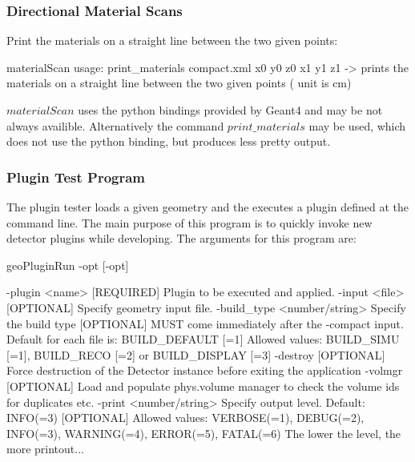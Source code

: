 \documentclass[10pt,a4paper]{article}
\begin{document}
\subsubsection{Directional Material Scans}
\label{sec:dd4hep-manual-directional-material-scans}
\noindent
Print the materials on a straight line between the two given points:
\begin{code}
materialScan
 usage: print_materials compact.xml x0 y0 z0 x1 y1 z1 
        -> prints the materials on a straight line between the two given points ( unit is cm) 
\end{code}
$materialScan$ uses the python bindings provided by Geant4 and may be not 
always availible. Alternatively the command $print\_materials$ may be used, 
which does not use the python binding, but produces less pretty output.

\subsubsection{Plugin Test Program}
\label{sec:dd4hep-manual-plugin-test}
\noindent
The plugin tester loads a given geometry and the executes a plugin
defined at the command line. The main purpose of this program is to quickly 
invoke new detector plugins while developing. The arguments for this 
program are:
\begin{code}
    geoPluginRun -opt [-opt]                                                
    
        -plugin <name>  [REQUIRED]  Plugin to be executed and applied.        
        -input  <file>  [OPTIONAL]  Specify geometry input file.              
        -build_type <number/string> Specify the build type                         
                     [OPTIONAL]     MUST come immediately after the -compact input.
                                    Default for each file is: BUILD_DEFAULT [=1]   
                                    Allowed values: BUILD_SIMU [=1], BUILD_RECO [=2] or BUILD_DISPLAY [=3]
        -destroy     [OPTIONAL]     Force destruction of the Detector instance         
                                    before exiting the application                 
        -volmgr      [OPTIONAL]     Load and populate phys.volume manager to       
                                    check the volume ids for duplicates etc.       
        -print      <number/string> Specify output level. Default: INFO(=3)        
                     [OPTIONAL]     Allowed values: VERBOSE(=1), DEBUG(=2),        
                                    INFO(=3), WARNING(=4), ERROR(=5), FATAL(=6)    
                                    The lower the level, the more printout...      


\end{code}
\end{document}
